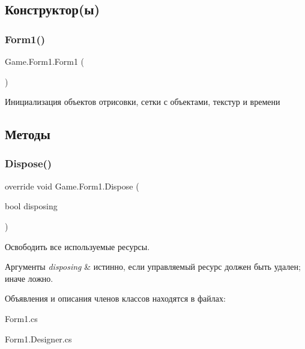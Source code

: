 \subsection{Конструктор(ы)}
\mbox{\label{class_game_1_1_form1_a6816169b9fcc0021728c2944b192e52c}} 
\subsubsection{\texorpdfstring{Form1()}{Form1()}}
{\footnotesize\ttfamily Game.\+Form1.\+Form1 (\begin{DoxyParamCaption}{ }\end{DoxyParamCaption})}



Инициализация объектов отрисовки, сетки с объектами, текстур и времени 



\subsection{Методы}
\mbox{\label{class_game_1_1_form1_ac06680e001f7a894e19cd07852190ea1}} 
\subsubsection{\texorpdfstring{Dispose()}{Dispose()}}
{\footnotesize\ttfamily override void Game.\+Form1.\+Dispose (\begin{DoxyParamCaption}\item[{bool}]{disposing }\end{DoxyParamCaption})\hspace{0.3cm}{\ttfamily [protected]}}



Освободить все используемые ресурсы. 


\begin{DoxyParams}{Аргументы}
{\em disposing} & истинно, если управляемый ресурс должен быть удален; иначе ложно.\\
\hline
\end{DoxyParams}


Объявления и описания членов классов находятся в файлах\+:\begin{DoxyCompactItemize}
\item 
Form1.\+cs\item 
Form1.\+Designer.\+cs\end{DoxyCompactItemize}
